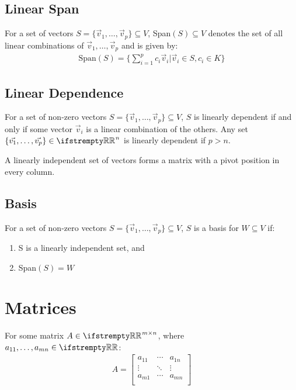 \documentclass[12pt, a4paper]{article}
\begin{document}
\begin{multicols*}{3}
\subsection{Linear Span}
For a set of vectors $S = \{\vec{v}_1,\ldots,\vec{v}_p\} \subseteq V$, Span$(S) \subseteq V$ denotes the set of all linear combinations of $\vec{v}_1,\ldots,\vec{v}_p$ and is given by:
\begin{align*}   
  \text{Span}(S) = \{ \sum^p_{i=1}c_i\vec{v}_i | \vec{v}_i \in S, c_i \in K\}
\end{align*}

\subsection{Linear Dependence}
For a set of non-zero vectors  $S = \{\vec{v}_1,\ldots,\vec{v}_p\} \subseteq V$, $S$ is linearly dependent if and only if some vector $\vec{v}_i$ is a linear combination of the others. Any set $\{\vec{v_1},\ldots,\vec{v_p}\} \in \RR^n$ is linearly dependent if $p>n$.

A linearly independent set of vectors forms a matrix with a pivot position in every column.

\subsection{Basis}
For a set of non-zero vectors  $S = \{\vec{v}_1,\ldots,\vec{v}_p\} \subseteq V$, $S$ is a basis for $W \subseteq V$ if:
\begin{enumerate}[\roman*.]
  \item S is a linearly independent set, and
  \item Span$(S) = W$
\end{enumerate}

\colbreak

\section{Matrices}
For some matrix $A \in \RR^{m{\times}n}$, where $a_{11},\ldots,a_{mn} \in \RR$:
\begin{align*}
  A = \begin{bmatrix}
    a_{11} & \cdots & a_{1n} \\
    \vdots & \ddots & \vdots \\
    a_{m1} & \cdots & a_{mn} \\
  \end{bmatrix}
\end{align*}


\end{multicols*}
\end{document}
